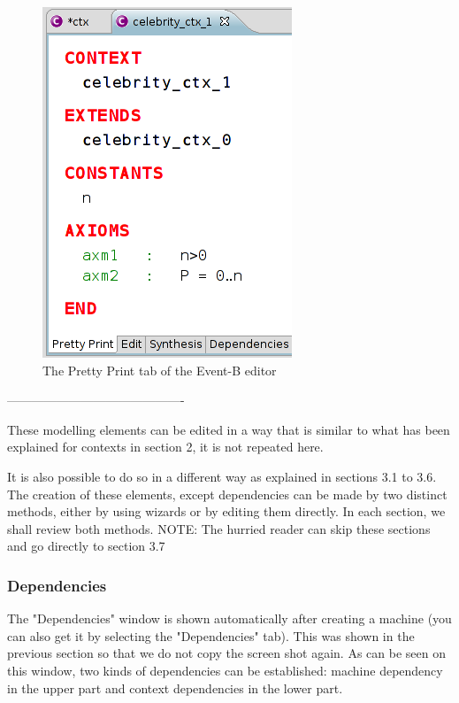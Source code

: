 \begin{figure}[!h]
\begin{center}
	\includegraphics{img/reference/ref_01_eventb_editor10.png}
	\caption{The Pretty Print tab of the Event-B editor}
	\label{fig_ref_01_eventb_editor10}
\end{center}
\end{figure}

-------------------------------------------

These modelling elements can be edited in a way that is similar to what has been explained for contexts in section 2, it is not repeated here.

It is also possible to do so in a different way as explained in sections 3.1 to 3.6. The creation of these elements, except dependencies can be made by two distinct methods, either by using wizards or by editing them directly. In each section, we shall review both methods. NOTE: The hurried reader can skip these sections and go directly to section 3.7 

\subsubsection{Dependencies}

The "Dependencies" window is shown automatically after creating a machine (you can also get it by selecting the "Dependencies" tab). This was shown in the previous section so that we do not copy the screen shot again. As can be seen on this window, two kinds of dependencies can be established: machine dependency in the upper part and context dependencies in the lower part.

